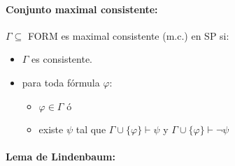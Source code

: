\paragraph{Conjunto maximal consistente:} $\Gamma\subseteq$ FORM es maximal consistente (m.c.) en SP si:
\begin{itemize}
	\item $\Gamma$ es consistente.
	\item para toda fórmula $\varphi$:
	\begin{itemize}
		\item $\varphi\in\Gamma$ ó
		\item existe $\psi$ tal que $\Gamma\cup\{\varphi\}\vdash\psi$ y $\Gamma\cup\{\varphi\}\vdash\lnot\psi$ 
	\end{itemize}
\end{itemize}

\paragraph{Lema de Lindenbaum:} 


